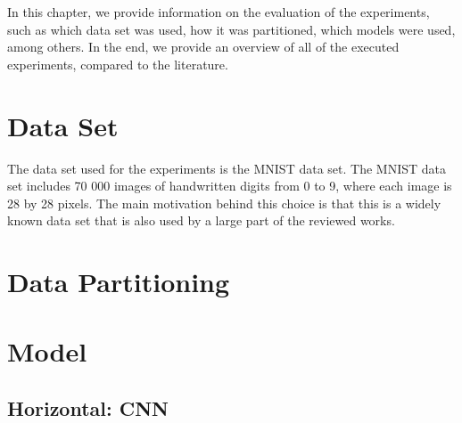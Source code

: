 \todo{}

In this chapter, we provide information on the evaluation of the experiments, such as which data set was used, how it was partitioned, which models were used, among others. In the end, we provide an overview of all of the executed experiments, compared to the literature.

\section{Data Set}

The data set used for the experiments is the MNIST \cite{lecun2010mnist} data set. The MNIST data set includes 70 000 images of handwritten digits from 0 to 9, where each image is 28 by 28 pixels. The main motivation behind this choice is that this is a widely known data set that is also used by a large part of the reviewed works.

\section{Data Partitioning}


\section{Model}

\subsection{Horizontal: CNN}









